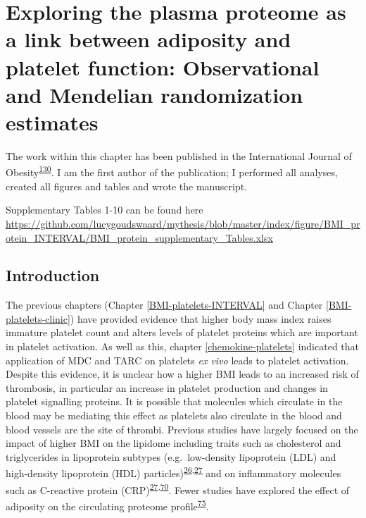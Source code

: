 \documentclass[11pt,twoside]{bristolthesis}
\begin{document}
\hypertarget{BMI-protein-MR}{%
\chapter{Exploring the plasma proteome as a link between adiposity and platelet function: Observational and Mendelian randomization estimates}\label{BMI-protein-MR}}

The work within this chapter has been published in the International Journal of Obesity\textsuperscript{\protect\hyperlink{ref-Goudswaard2021}{130}}. I am the first author of the publication; I performed all analyses, created all figures and tables and wrote the manuscript.

Supplementary Tables 1-10 can be found here \url{https://github.com/lucygoudswaard/mythesis/blob/master/index/figure/BMI_protein_INTERVAL/BMI_protein_supplementary_Tables.xlsx}

\hypertarget{introduction-1}{%
\section{Introduction}\label{introduction-1}}

The previous chapters (Chapter \ref{BMI-platelets-INTERVAL} and Chapter \ref{BMI-platelets-clinic}) have provided evidence that higher body mass index raises immature platelet count and alters levels of platelet proteins which are important in platelet activation. As well as this, chapter \ref{chemokine-platelets} indicated that application of MDC and TARC on platelets \emph{ex vivo} leads to platelet activation. Despite this evidence, it is unclear how a higher BMI leads to an increased risk of thrombosis, in particular an increase in platelet production and changes in platelet signalling proteins. It is possible that molecules which circulate in the blood may be mediating this effect as platelets also circulate in the blood and blood vessels are the site of thrombi. Previous studies have largely focused on the impact of higher BMI on the lipidome including traits such as cholesterol and triglycerides in lipoprotein subtypes (e.g.~low-density lipoprotein (LDL) and high-density lipoprotein (HDL) particles)\textsuperscript{\protect\hyperlink{ref-Bell2018a}{26},\protect\hyperlink{ref-Wurtz2014}{27}} and on inflammatory molecules such as C-reactive protein (CRP)\textsuperscript{\protect\hyperlink{ref-Wurtz2014}{27},\protect\hyperlink{ref-Timpson2011}{70}}. Fewer studies have explored the effect of adiposity on the circulating proteome profile\textsuperscript{\protect\hyperlink{ref-Cominetti2018}{75}}.
\end{document}
